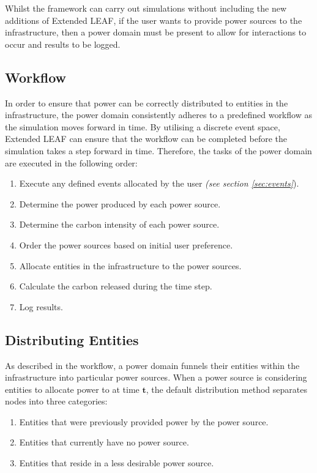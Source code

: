 \documentclass{l4proj}
\begin{document}
Whilst the framework can carry out simulations without including the new additions of Extended LEAF, if the user wants to provide power sources to the infrastructure, then a power domain must be present to allow for interactions to occur and results to be logged.

\subsection{Workflow}\label{subsec:power-domain-workflow}
In order to ensure that power can be correctly distributed to entities in the infrastructure, the power domain consistently adheres to a predefined workflow as the simulation moves forward in time.
By utilising a discrete event space, Extended LEAF can ensure that the workflow can be completed before the simulation takes a step forward in time.
Therefore, the tasks of the power domain are executed in the following order:
\begin{enumerate}
    \item Execute any defined events allocated by the user \emph{(see section \ref{sec:events}}).
    \item Determine the power produced by each power source.
    \item Determine the carbon intensity of each power source.
    \item Order the power sources based on initial user preference.
    \item Allocate entities in the infrastructure to the power sources.
    \item Calculate the carbon released during the time step.
    \item Log results.
\end{enumerate}

\subsection{Distributing Entities}\label{subsec:distributing-entities}
As described in the workflow, a power domain funnels their entities within the infrastructure into particular power sources.
When a power source is considering entities to allocate power to at time $\mathbf{t}$, the default distribution method separates nodes into three categories:
\begin{enumerate}
    \item Entities that were previously provided power by the power source.
    \item Entities that currently have no power source.
    \item Entities that reside in a less desirable power source.
\end{enumerate}
\end{document}
